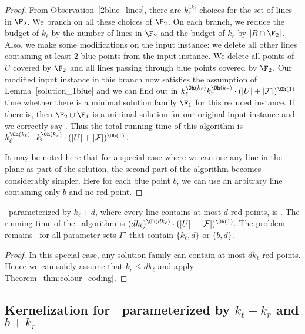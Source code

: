\begin{proof}
 From Observation~\ref{2blue_lines}, there are $k_\ell^{4k_\ell}$ choices for the set of lines in $\F_2$. We branch on all these choices of $\F_2$. On each branch, we reduce the budget of $k_\ell$ by the number of lines in $\F_2$ and the budget of $k_r$ by $\vert R \cap \F_2 \vert$. Also, we make some modifications on the input instance: we delete all other lines containing at least $2$ blue points from the input instance. We delete all points of $U$ covered by $\F_2$ and all lines passing through blue points covered by $\F_2$. Our modified input instance in this branch now satisfies the assumption of Lemma~\ref{solution_1blue} and we can find out in $k_\ell^{\Oh(k_\ell)}k_r^{\Oh(k_r)}\cdot (\vert U\vert +\vert {\cal F} \vert)^{\Oh(1)}$ time whether there is a minimal solution family $\F_1$ for this reduced instance. If there is, then $\F_2 \cup \F_1$ is a minimal solution for our original input instance and we correctly say \YES.
Thus the total running time of this algorithm is $k_\ell^{\Oh(k_\ell)} \cdot k_r^{\Oh(k_r)} \cdot (\vert U \vert + \vert {\cal F}\vert)^{\Oh(1)}$. 

It  may be noted here that for a special case where we can use any line in the plane as part of the solution, the second part of the algorithm becomes considerably simpler. Here for each blue point $b$, we can use an arbitrary line containing only $b$ and no red point.
 \end{proof} 
 





\begin{corollary}\label{sp_case_red}
\slrbsc\ parameterized by $k_\ell+d$, where every line contains at most $d$ red points, is \FPT. The running time of the \FPT\ algorithm is $(dk_\ell)^{\Oh(dk_\ell)} \cdot (\vert U\vert +\vert {\cal F}\vert)^{\Oh(1)}$. The problem remains \FPT\ for all parameter sets $\Gamma'$ that contain $\{k_\ell,d\}$ or $\{b,d\}$. 
\end{corollary}

\begin{proof}
In this special case, any solution family can contain at most $dk_\ell$ red points. Hence we can safely assume that $k_r \leq dk_\ell$ and apply Theorem~\ref{thm:colour_coding}. 
\end{proof}
\subsection{Kernelization for \slrbsc\ parameterized by $k_\ell+k_r$ and $b+k_r$}


